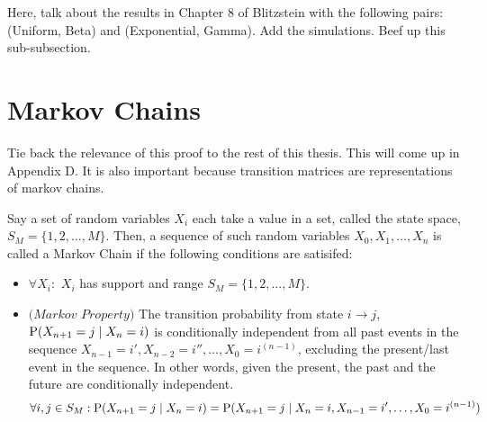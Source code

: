 Here, talk about the results in Chapter 8 of Blitzstein with the following pairs: (Uniform, Beta) and (Exponential, Gamma). Add the simulations. Beef up this sub-subsection.



\newpage
\section{Markov Chains}


Tie back the relevance of this proof to the rest of this thesis. This will come up in Appendix D. It is also important because transition matrices are representations of markov chains.



\begin{definition} Say a set of random variables $X_i$ each take a value in a set, called the state space, $S_M = \{1,2,\dots,M\}$. Then, a sequence of such random variables $X_0,X_1,\dots,X_n$ is called a Markov Chain if the following conditions are satisifed:
\end{definition}

\begin{itemize}
\item $\forall X_i:$ $X_i$ has support and range $S_M = \{1,2,...,M\}$.
\item $\textit{(Markov Property)}$ The transition probability from state $i \to j$, $\text{P}(X_{n+1} = j \mid X_n = i)$ is conditionally independent from all past events in the sequence $X_{n-1} = i',X_{n-2} = i'', \dots,X_0 = i^{(n-1)}$, excluding the present/last event in the sequence. In other words, given the present, the past and the future are conditionally independent.
$$\forall i,j \in S_M: \text{P}(X_{n+1} = j \mid X_n = i) = \text{P}(X_{n+1} = j \mid X_n = i, X_{n-1} = i', \dots,X_0 = i^{(n-1)})$$
\end{itemize}

